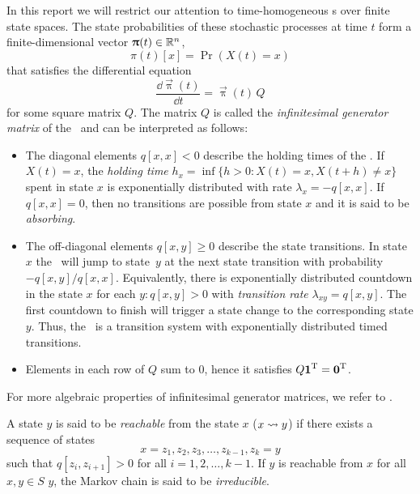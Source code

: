 In this report we will restrict our attention to time-homogeneous \CTMC
s over finite state spaces. The state probabilities of these
stochastic processes at time $t$ form a finite-dimensional vector
$\bm{\mathrm{\uppi}}(t) \in \mathbb{R}^n$,
\begin{equation}
  \pi(t)[x] = \Pr(X(t) = x)
\end{equation}
that satisfies the differential equation
\begin{equation}
  \label{eq:background:ctmc:diffeq}
  \frac{\dd \vec{\uppi}(t)}{\dd t} = \vec{\uppi}(t) \, Q
\end{equation}
for some square matrix $Q$. The matrix $Q$ is called the
\emph{infinitesimal generator matrix} of the \CTMC\ and can be
interpreted as follows:
\begin{itemize}
\item The diagonal elements $q[x, x] < 0$ describe the holding times
  of the \CTMC. If $X(t) = x$, the \emph{holding time}
  $h_x = \inf \{ h > 0 : X(t) = x, X(t + h) \ne x \}$ spent in state $x$ is
  exponentially distributed with rate $\lambda_x = -q[x, x]$. If
  $q[x, x] = 0$, then no transitions are possible from state $x$ and
  it is said to be \emph{absorbing}.
\item The off-diagonal elements $q[x, y] \ge 0$ describe the state
  transitions. In state~$x$ the \CTMC\ will jump to state~$y$ at the
  next state transition with probability $-q[x, y] / q[x, x]$.
  Equivalently, there is exponentially distributed countdown in the
  state $x$ for each $y : q[x, y] > 0$ with \emph{transition rate}
  $\lambda_{xy} = q[x, y]$. The first countdown to finish will trigger
  a state change to the corresponding state $y$. Thus, the \CTMC\ is a
  transition system with exponentially distributed timed transitions.
\item Elements in each row of $Q$ sum to $0$, hence it satisfies
  $Q \bm{\mathrm{1}}^{\mathrm{T}} = \bm{\mathrm{0}}^{\mathrm{T}}$.
\end{itemize}

For more algebraic properties of infinitesimal generator matrices, we
refer to \citet{plemmons1979nonnegative,stewart1994introduction}.

A state $y$ is said to be \emph{reachable} from the state $x$
($x \leadsto y$) if there exists a sequence of states
\begin{equation}
  x = z_1, z_2, z_3, \ldots, z_{k - 1}, z_k = y
\end{equation}
such that $q[z_i, z_{i + 1}] > 0$ for all $i = 1, 2, \ldots, k -
1$.
If $y$ is reachable from $x$ for all $x, y \in S$ $y$, the Markov chain
is said to be \emph{irreducible}.

